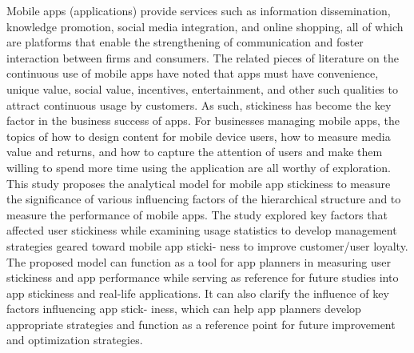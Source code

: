 \documentclass{article}
\begin{document}
\medskip

Mobile apps (applications) provide services such as information dissemination, knowledge promotion,
social media integration, and online shopping, all of which are platforms that enable the strengthening
of communication and foster interaction between firms and consumers. The related pieces of literature
on the continuous use of mobile apps have noted that apps must have convenience, unique value, social
value, incentives, entertainment, and other such qualities to attract continuous usage by customers. As
such, stickiness has become the key factor in the business success of apps. For businesses managing
mobile apps, the topics of how to design content for mobile device users, how to measure media value
and returns, and how to capture the attention of users and make them willing to spend more time using
the application are all worthy of exploration. This study proposes the analytical model for mobile app
stickiness to measure the significance of various influencing factors of the hierarchical structure and to
measure the performance of mobile apps. The study explored key factors that affected user stickiness
while examining usage statistics to develop management strategies geared toward mobile app sticki-
ness to improve customer/user loyalty. The proposed model can function as a tool for app planners in
measuring user stickiness and app performance while serving as reference for future studies into app
stickiness and real-life applications. It can also clarify the influence of key factors influencing app stick-
iness, which can help app planners develop appropriate strategies and function as a reference point for
future improvement and optimization strategies. \cite{hsu2020development}

\medskip


\printbibliography
\end{document}
